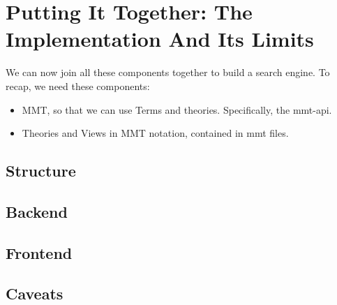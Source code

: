 \section{Putting It Together: The Implementation And Its Limits}
\label{sec:pit}


We can now join all these components together to build a search engine. To recap, we need these components:
\begin{itemize}
  \item MMT, so that we can use Terms and theories. Specifically, the mmt-api.
  \item Theories and Views in MMT notation, contained in mmt files.
\end{itemize}
\subsection{Structure}
\subsection{Backend}
\subsection{Frontend}
\label{sec:frontend}
\subsection{Caveats}
